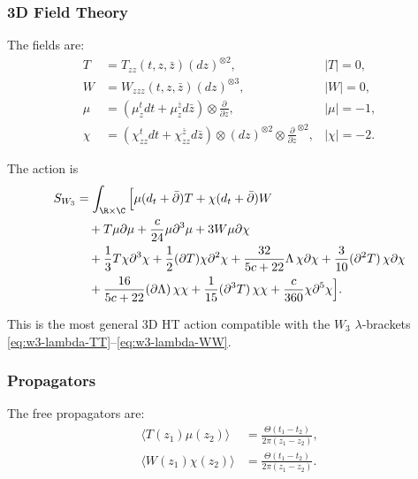 \subsubsection{3D Field Theory}

The fields are:
\begin{align}
T &= T_{zz}(t,z,\bar{z}) (dz)^{\otimes 2}, & |T| = 0,\\
W &= W_{zzz}(t,z,\bar{z}) (dz)^{\otimes 3}, & |W| = 0,\\
\mu &= (\mu^t_z dt + \mu^{\bar{z}}_z d\bar{z}) \otimes \frac{\partial}{\partial z}, & |\mu| = -1,\\
\chi &= (\chi^t_{zz} dt + \chi^{\bar{z}}_{zz} d\bar{z}) \otimes (dz)^{\otimes 2} \otimes \frac{\partial}{\partial z}^{\otimes 2}, & |\chi| = -2.
\end{align}

The action is
\begin{align}
S_{W_3} &= \int_{\R \times \C} \Big[ \mu (d_t + \bar{\partial})T + \chi (d_t + \bar{\partial})W \notag\\
&\quad + T \mu \partial \mu + \frac{c}{24} \mu \partial^3 \mu + 3W \mu \partial \chi \notag\\
&\quad + \frac{1}{3}T \chi \partial^3 \chi + \frac{1}{2}(\partial T) \chi \partial^2 \chi + \frac{32}{5c+22}\Lambda\, \chi \partial \chi + \frac{3}{10}(\partial^2 T)\,\chi \partial \chi \notag\\
&\quad + \frac{16}{5c+22}(\partial\Lambda)\, \chi \chi + \frac{1}{15}(\partial^3 T)\,\chi \chi + \frac{c}{360} \chi \partial^5 \chi \Big].
\end{align}

This is the most general 3D HT action compatible with the $W_3$ $\lambda$-brackets \eqref{eq:w3-lambda-TT}--\eqref{eq:w3-lambda-WW}.

\subsubsection{Propagators}

The free propagators are:
\begin{align}
\langle T(z_1) \mu(z_2) \rangle &= \frac{\Theta(t_1-t_2)}{2\pi(z_1-z_2)},\\
\langle W(z_1) \chi(z_2) \rangle &= \frac{\Theta(t_1-t_2)}{2\pi(z_1-z_2)}.
\end{align}


